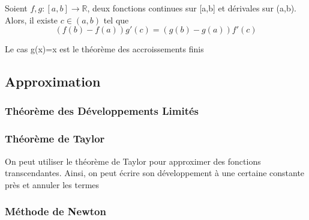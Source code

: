 \documentclass{article}
\begin{document}
\begin{lemma}
    Soient $f,g:[a,b] \to \mathbb{R}$, deux fonctions continues sur [a,b]
    et dérivales sur (a,b). Alors, il existe $c \in (a,b)$ tel que
    $$ (f(b) - f(a)) g'(c) = (g(b)-g(a))f'(c) $$
\end{lemma}

\begin{remark}
    Le cas g(x)=x est le théorème des accroissements finis
\end{remark}

\begin{remark}

\end{remark}

\subsection{Approximation}

\subsubsection{Théorème des Développements Limités}

\begin{definition}

\end{definition}

\subsubsection{Théorème de Taylor}

\begin{theorem}

\end{theorem}

\begin{problem}
    On peut utiliser le théorème de Taylor pour approximer des fonctions
    transcendantes. Ainsi, on peut écrire son développement à une certaine
    constante près et annuler les termes
\end{problem}


\subsubsection{Méthode de Newton}
\end{document}
